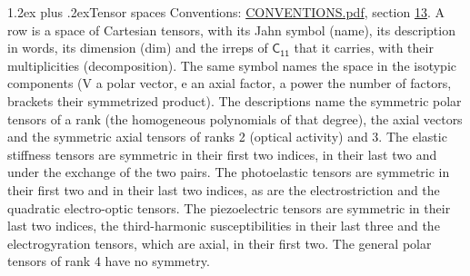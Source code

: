 \documentclass[10pt,a4paper]{article}
\makeatletter
\renewcommand\section{\@startsection{section}{1}{\z@}{-3ex plus -1ex minus -.2ex}%
  {1.2ex plus .2ex}{\normalfont\large\sffamily\bfseries\color{parttitle}}}
\numberwithin{equation}{section}
\newcommand{\grp}[1]{\mathsf{#1}}
\makeatother
\begin{document}
\section{Tensor spaces}\label{s:tensor_spaces}
Conventions: \href{../../CONVENTIONS.pdf}{CONVENTIONS.pdf}, section \href{../../CONVENTIONS.pdf\#conv.13}{13}.
\leavevmode\label{n:head.name}\label{n:head.description}\label{n:head.dim}\label{n:head.decomposition}A row is a space of Cartesian tensors, with its Jahn symbol (name), its description in words, its dimension (dim) and the irreps of $\grp{C_{11}}$ that it carries, with their multiplicities (decomposition). \label{n:label.jahn}The same symbol names the space in the isotypic components (V a polar vector, e an axial factor, a power the number of factors, brackets their symmetrized product). The descriptions name the symmetric polar tensors of a rank (the homogeneous polynomials of that degree), the axial vectors and the symmetric axial tensors of ranks 2 (optical activity) and 3. The elastic stiffness tensors are symmetric in their first two indices, in their last two and under the exchange of the two pairs. The photoelastic tensors are symmetric in their first two and in their last two indices, as are the electrostriction and the quadratic electro-optic tensors. The piezoelectric tensors are symmetric in their last two indices, the third-harmonic susceptibilities in their last three and the electrogyration tensors, which are axial, in their first two. The general polar tensors of rank 4 have no symmetry.
\end{document}

